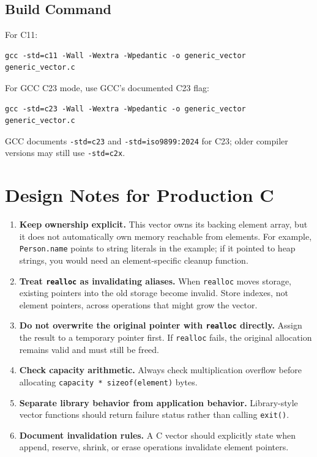 \documentclass[11pt]{article}
\begin{document}
\subsection*{Build Command}

For C11:

\begin{verbatim}
gcc -std=c11 -Wall -Wextra -Wpedantic -o generic_vector generic_vector.c
\end{verbatim}

For GCC C23 mode, use GCC's documented C23 flag:

\begin{verbatim}
gcc -std=c23 -Wall -Wextra -Wpedantic -o generic_vector generic_vector.c
\end{verbatim}

GCC documents \texttt{-std=c23} and \texttt{-std=iso9899:2024} for C23; older compiler versions may still use \texttt{-std=c2x}. \cite{gcc-standards}

\section{Design Notes for Production C}

\begin{enumerate}
  \item \textbf{Keep ownership explicit.} This vector owns its backing element array, but it does not automatically own memory reachable from elements. For example, \texttt{Person.name} points to string literals in the example; if it pointed to heap strings, you would need an element-specific cleanup function.
  \item \textbf{Treat \texttt{realloc} as invalidating aliases.} When \texttt{realloc} moves storage, existing pointers into the old storage become invalid. Store indexes, not element pointers, across operations that might grow the vector.
  \item \textbf{Do not overwrite the original pointer with \texttt{realloc} directly.} Assign the result to a temporary pointer first. If \texttt{realloc} fails, the original allocation remains valid and must still be freed. \cite{cppref-realloc}
  \item \textbf{Check capacity arithmetic.} Always check multiplication overflow before allocating \texttt{capacity * sizeof(element)} bytes.
  \item \textbf{Separate library behavior from application behavior.} Library-style vector functions should return failure status rather than calling \texttt{exit()}.
  \item \textbf{Document invalidation rules.} A C vector should explicitly state when append, reserve, shrink, or erase operations invalidate element pointers.
\end{enumerate}
\end{document}
